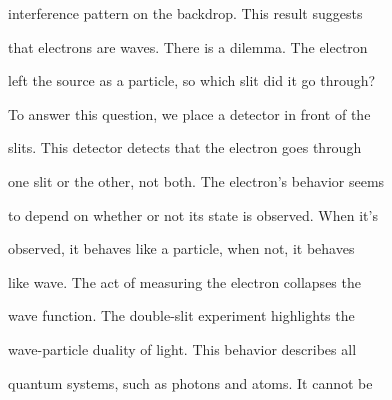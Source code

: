 \documentclass[a4paper,portrait,12pt]{article}
\begin{document}
\begin{flushleft}
interference pattern on the backdrop. This result suggests
\end{flushleft}


\begin{flushleft}
that electrons are waves. There is a dilemma. The electron
\end{flushleft}


\begin{flushleft}
left the source as a particle, so which slit did it go through?
\end{flushleft}


\begin{flushleft}
To answer this question, we place a detector in front of the
\end{flushleft}


\begin{flushleft}
slits. This detector detects that the electron goes through
\end{flushleft}


\begin{flushleft}
one slit or the other, not both. The electron's behavior seems
\end{flushleft}


\begin{flushleft}
to depend on whether or not its state is observed. When it's
\end{flushleft}


\begin{flushleft}
observed, it behaves like a particle, when not, it behaves
\end{flushleft}


\begin{flushleft}
like wave. The act of measuring the electron collapses the
\end{flushleft}


\begin{flushleft}
wave function. The double-slit experiment highlights the
\end{flushleft}


\begin{flushleft}
wave-particle duality of light. This behavior describes all
\end{flushleft}





\begin{flushleft}
\newpage
quantum systems, such as photons and atoms. It cannot be
\end{flushleft}
\end{document}
